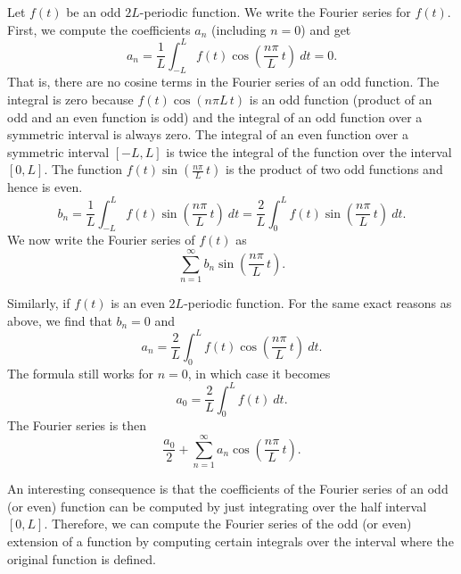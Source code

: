 Let $f(t)$ be an odd $2L$-periodic function.  We write 
the Fourier series for $f(t)$.  First, we compute the coefficients $a_n$ (including
$n=0$) and get
\begin{equation*}
a_n = \frac{1}{L} \int_{-L}^L f(t) \cos \left( \frac{n \pi}{L} \, t \right)
~ dt = 0 .
\end{equation*}
That is, there are no cosine terms in the Fourier series of an odd function.
The integral is zero
because $f(t) \cos \left( {n \pi}{L} \,t \right)$
is an odd function (product of an odd and an
even function is odd) and the integral of an odd function over a symmetric
interval is always zero.
The integral of an even function over a symmetric interval
$[-L,L]$ is twice the integral of the function over the interval $[0,L]$.
The function $f(t) \sin \left( \frac{n \pi}{L} \, t \right)$ is the product of two odd
functions and hence is even.
\begin{equation*}
b_n = 
\frac{1}{L} \int_{-L}^L f(t) \sin \left( \frac{n \pi}{L} \, t \right) ~ dt =
\frac{2}{L} \int_{0}^L f(t) \sin \left( \frac{n \pi}{L} \, t \right) ~ dt .
\end{equation*}
We now write the Fourier series of $f(t)$ as
\begin{equation*}
\sum_{n=1}^\infty b_n \sin \left( \frac{n \pi}{L} \, t \right) .
\end{equation*}

Similarly, if $f(t)$ is an even $2L$-periodic function.  For the same exact
reasons as above, we find that $b_n = 0$ and
\begin{equation*}
a_n = 
\frac{2}{L} \int_{0}^L f(t) \cos \left( \frac{n \pi}{L} \, t \right) ~ dt .
\end{equation*}
The formula still works for $n=0$, in which case it becomes
\begin{equation*}
a_0 = 
\frac{2}{L} \int_{0}^L f(t) ~ dt .
\end{equation*}
The Fourier series is then
\begin{equation*}
\frac{a_0}{2}
+
\sum_{n=1}^\infty a_n \cos \left( \frac{n \pi}{L} \, t \right) .
\end{equation*}

An interesting consequence is that the coefficients of the Fourier series of
an odd (or even) function can be computed by just integrating over the half
interval $[0,L]$.  Therefore, we can compute the Fourier series of
the odd (or even) extension of a
function by computing certain integrals over the interval
where the original function is defined.

